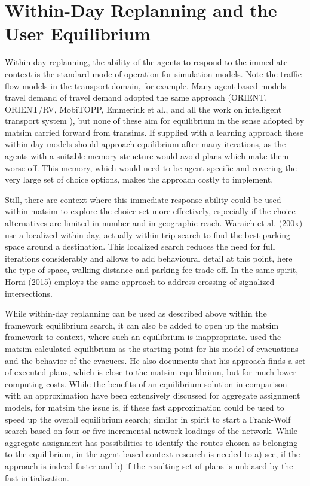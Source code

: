 \section{Within-Day Replanning and the User Equilibrium}
\label{sec:researchavenues-withinday}
Within-day replanning, \ie the ability of the agents to respond to the immediate context is the standard mode of operation for simulation models. Note the traffic flow models in the transport domain, for example. Many agent based models travel demand of travel demand adopted the same approach (ORIENT, ORIENT/RV, MobiTOPP, Emmerink et al.,  and all the work on intelligent transport system ), but none of these aim for equilibrium in the sense adopted by \gls{matsim} carried forward from \gls{transims}. If supplied with a learning approach these within-day models should approach equilibrium after many iterations, as the agents with a suitable memory structure would avoid plans which make them worse off. This memory, which would need to be agent-specific and covering the very large set of choice options, makes the approach costly to implement. 

Still, there are context where this immediate response ability could be used within \gls{matsim} to explore the choice set more effectively, especially if the choice alternatives are limited in number and in geographic reach. Waraich et al. (200x)  use a localized within-day, actually within-trip search to find the best parking space around a destination. This localized search reduces the need for full iterations considerably and allows to add behavioural detail at this point, here the type of space, walking distance and parking fee trade-off. In the same spirit, Horni (2015)  employs the same approach to address crossing of signalized intersections. 

While within-day replanning can be used as described above within the framework equilibrium search, it can also be added to open up the \gls{matsim} framework to context, where such an equilibrium is inappropriate. \citet[][]{Dobler_PhDThesis_2013} used the \gls{matsim} calculated equilibrium as the starting point for his model of evacuations and the behavior of the evacuees. He also documents that his approach finds a set of executed plans, which is close to the \gls{matsim} equilibrium, but for much lower computing costs. While the benefits of an equilibrium solution in comparison with an approximation have been extensively discussed for aggregate assignment models, for \gls{matsim} the issue is, if these fast approximation could be used to speed up the overall equilibrium search; similar in spirit to start a Frank-Wolf search based on four or five incremental network loadings of the network. While aggregate assignment has possibilities to identify the routes chosen as belonging to the equilibrium, in the agent-based context research is needed to a) see, if the approach is indeed faster and b) if the resulting set of plans is unbiased by the fast initialization. 


